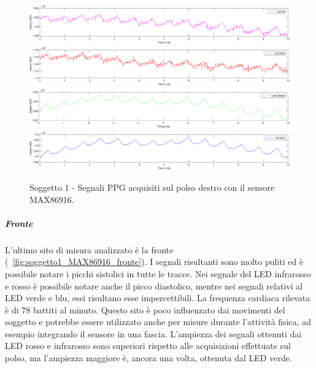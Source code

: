 \begin{figure}[h]
	\centering
	\includegraphics[width=1\linewidth]{ImageFiles/Misure Preliminari/Soggetto 1/MAX86916/polso_ired}
	\includegraphics[width=1\linewidth]{ImageFiles/Misure Preliminari/Soggetto 1/MAX86916/polso_red}
	\includegraphics[width=1\linewidth]{ImageFiles/Misure Preliminari/Soggetto 1/MAX86916/polso_green}
	\includegraphics[width=1\linewidth]{ImageFiles/Misure Preliminari/Soggetto 1/MAX86916/polso_blu}
	\caption{Soggetto 1 - Segnali PPG acquisiti sul polso destro con il sensore MAX86916.}
	\label{fig:soggetto1_MAX86916_polso}
\end{figure}

\clearpage

\subparagraph{Fronte}

L'ultimo sito di misura analizzato è la fronte (\Fig~\ref{fig:soggetto1_MAX86916_fronte}). I segnali risultanti sono molto puliti ed è possibile notare i picchi sistolici in tutte le tracce. Nei segnale del LED infrarosso e rosso è possibile notare anche il picco diastolico, mentre nei segnali relativi al LED verde e blu, essi risultano esse impercettibili. La frequenza cardiaca rilevata è di 78 battiti al minuto. Questo sito è poco influenzato dai movimenti del soggetto e potrebbe essere utilizzato anche per misure durante l'attività fisica, ad esempio integrando il sensore in una fascia. L'ampiezza dei segnali ottenuti dai LED rosso e infrarosso sono superiori rispetto alle acquisizioni effettuate sul polso, ma l'ampiezza maggiore è, ancora una volta, ottenuta dal LED verde.

